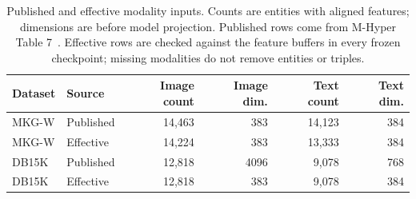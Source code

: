\begin{table}[tbp]
\centering\small
\caption{Published and effective modality inputs. Counts are entities with aligned features; dimensions are before model projection. Published rows come from M-Hyper Table 7~\citep{mhyper}. Effective rows are checked against the feature buffers in every frozen checkpoint; missing modalities do not remove entities or triples.}
\label{tab:data-modalities}
\begin{tabular}{llrrrr}
\toprule
Dataset & Source & Image count & Image dim. & Text count & Text dim.\\
\midrule
MKG-W & Published & 14,463 & 383 & 14,123 & 384\\
MKG-W & Effective & 14,224 & 383 & 13,333 & 384\\
DB15K & Published & 12,818 & 4096 & 9,078 & 768\\
DB15K & Effective & 12,818 & 383 & 9,078 & 384\\
\bottomrule
\end{tabular}
\end{table}
